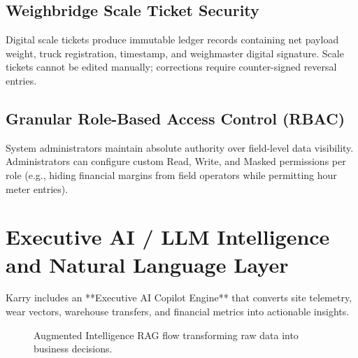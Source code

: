\documentclass[11pt, a4paper]{article}
\begin{document}
\subsection{Weighbridge Scale Ticket Security}
Digital scale tickets produce immutable ledger records containing net payload weight, truck registration, timestamp, and weighmaster digital signature. Scale tickets cannot be edited manually; corrections require counter-signed reversal entries.

\subsection{Granular Role-Based Access Control (RBAC)}
System administrators maintain absolute authority over field-level data visibility. Administrators can configure custom Read, Write, and Masked permissions per role (e.g., hiding financial margins from field operators while permitting hour meter entries).

\section{Executive AI / LLM Intelligence and Natural Language Layer}

Karry includes an **Executive AI Copilot Engine** that converts site telemetry, wear vectors, warehouse transfers, and financial metrics into actionable insights.

\begin{figure}[htbp]
  \centering
  \caption{Augmented Intelligence RAG flow transforming raw data into business decisions.}
  \label{fig:ai_flow}
\end{figure}
\end{document}
